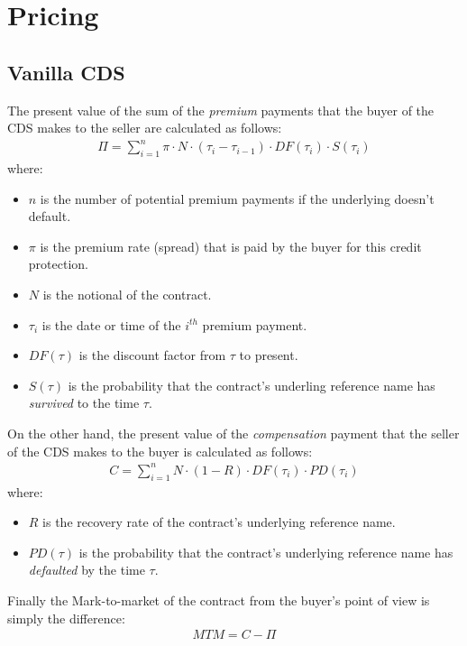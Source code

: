 \documentclass{report}
\theoremstyle{plain}
\theoremstyle{definition}
\begin{document}
\section{Pricing}
\subsection{Vanilla CDS}
The present value of the sum of the \emph{premium} payments that the buyer of the CDS makes to the seller are calculated as follows:
\begin{align*}
\Pi = \sum_{i=1}^{n}\pi \cdot N \cdot (\tau_i - \tau_{i-1}) \cdot DF(\tau_i) \cdot S(\tau_i)
\end{align*}
where:
\begin{itemize}
	\item $n$ is the number of potential premium payments if the underlying doesn't default.
	\item $\pi$ is the premium rate (spread) that is paid by the buyer for this credit protection.
	\item $N$ is the notional of the contract.
	\item $\tau_i$ is the date or time of the $i^{th}$ premium payment.
	\item $DF(\tau)$ is the discount factor from $\tau$ to present.
	\item $S(\tau)$ is the probability that the contract's underling reference name has \emph{survived} to the time $\tau$.
\end{itemize}

On the other hand, the present value of the \emph{compensation} payment that the seller of the CDS makes to the buyer is calculated as follows:
\begin{align*}
C = \sum_{i=1}^{n} N \cdot (1-R) \cdot DF(\tau_i) \cdot PD(\tau_i)
\end{align*}
where:
\begin{itemize}
	\item $R$ is the recovery rate of the contract's underlying reference name.
	\item $PD(\tau)$ is the probability that the contract's underlying reference name has \emph{defaulted} by the time $\tau$.
\end{itemize}

Finally the Mark-to-market of the contract from the buyer's point of view is simply the difference:
\begin{align*}
MTM = C - \Pi
\end{align*}
\end{document}
